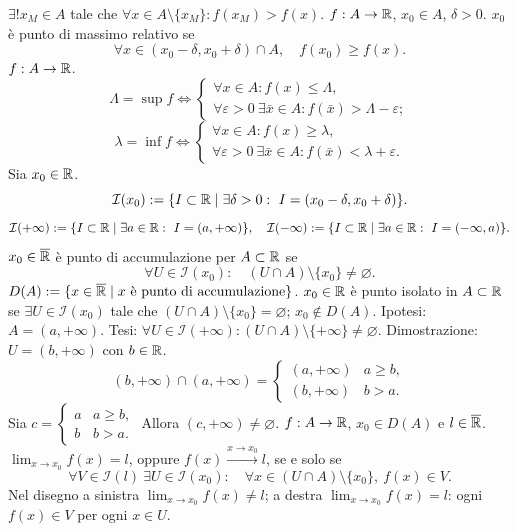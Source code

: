 $\exists!x_M\in A$ tale che $\forall x\in A\setminus\{x_M\}:f(x_M)>f(x)$.
$f:A\to\mathbb R$, $x_0\in A$, $\delta>0$.
$x_0$ è punto di massimo relativo se
\[\forall x\in(x_0-\delta,x_0+\delta)\cap A,\quad f(x_0)\ge f(x).\]
$f:A\to\mathbb R$.
\[\Lambda=\sup f\iff\begin{cases}\forall x\in A:f(x)\le\Lambda,\\\forall\varepsilon>0\ \exists\bar x\in A:f(\bar x)>\Lambda-\varepsilon;\end{cases}\]
\[\lambda=\inf f\iff\begin{cases}\forall x\in A:f(x)\ge\lambda,\\\forall\varepsilon>0\ \exists\bar x\in A:f(\bar x)<\lambda+\varepsilon.\end{cases}\]
Sia $x_0\in\mathbb R$.
\[\mathcal I(x_0):=\{I\subset\R\mid\exists\delta>0:\ I=(x_0-\delta,x_0+\delta)\}.\]
\[\mathcal I(+\infty):=\{I\subset\R\mid\exists a\in\R:\ I=(a,+\infty)\},\quad
\mathcal I(-\infty):=\{I\subset\R\mid\exists a\in\R:\ I=(-\infty,a)\}.\]
$x_0\in\overline{\mathbb R}$ è punto di accumulazione per $A\subset\mathbb R$ se
\[\forall U\in\mathcal I(x_0):\quad(U\cap A)\setminus\{x_0\}\ne\varnothing.\]
$D(A):=\{x\in\overline{\mathbb R}\mid x\text{ è punto di accumulazione}\}$.
$x_0\in\mathbb R$ è punto isolato in $A\subset\mathbb R$ se
$\exists U\in\mathcal I(x_0)$ tale che $(U\cap A)\setminus\{x_0\}=\varnothing$;
$x_0\notin D(A)$.
Ipotesi: $A=(a,+\infty)$.
Tesi: $\forall U\in\mathcal I(+\infty):(U\cap A)\setminus\{+\infty\}\ne\varnothing$.
Dimostrazione: $U=(b,+\infty)$ con $b\in\mathbb R$.
\[(b,+\infty)\cap(a,+\infty)=\begin{cases}(a,+\infty)&a\ge b,\\(b,+\infty)&b>a.\end{cases}\]
Sia $c=\begin{cases}a&a\ge b,\\b&b>a.\end{cases}$ Allora $(c,+\infty)\ne\varnothing$.
$f:A\to\mathbb R$, $x_0\in D(A)$ e $l\in\overline{\mathbb R}$.
$\lim_{x\to x_0}f(x)=l$, oppure $f(x)\xrightarrow{x\to x_0}l$, se e solo se
\[\forall V\in\mathcal I(l)\ \exists U\in\mathcal I(x_0):\quad\forall x\in(U\cap A)\setminus\{x_0\},\ f(x)\in V.\]
Nel disegno a sinistra $\lim_{x\to x_0}f(x)\ne l$; a destra $\lim_{x\to x_0}f(x)=l$: ogni $f(x)\in V$ per ogni $x\in U$.
